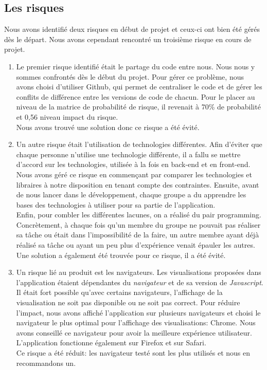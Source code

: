 \documentclass[t, 12pt, usenames,dvipsnames]{article}
\begin{document}
    \subsection{Les risques}
        \noindent Nous avons identifié deux risques en début de projet et ceux-ci ont bien été gérés dès le départ. Nous avons cependant rencontré un troisième risque en cours de projet. 
    
    \begin{enumerate}
        \item  Le premier risque identifié était le partage du code entre nous. Nous nous y sommes confrontés dès le début du projet. Pour gérer ce problème, nous avons choisi d'utiliser Github, qui permet de  centraliser le code et de gérer les conflits de différence entre les versions de code de chacun. Pour le placer au niveau de la matrice de probabilité de risque, il revenait à 70\% de probabilité et 0,56 niveau impact du risque. \\ Nous avons trouvé une solution donc ce risque a été évité.
        \item Un autre risque était l'utilisation de technologies différentes. Afin d'éviter que chaque personne n'utilise une technologie différente, il a fallu se mettre d'accord sur les technologies, utilisée à la fois en back-end et en front-end. Nous avons géré ce risque en commençant par comparer les technologies et libraires à notre disposition en tenant compte des contraintes.
        Ensuite, avant de nous lancer dans le développement, chaque groupe a du apprendre les bases des technologies à utiliser pour sa partie de l'application.\\
        Enfin, pour combler les différentes lacunes, on a réalisé du pair programming.
        Concrètement, à chaque fois qu'un membre du groupe ne pouvait pas réaliser sa tâche ou était dans l'impossibilité de la faire, un autre membre ayant déjà réalisé sa tâche ou ayant un peu plus d'expérience venait épauler les autres.\\ Une solution a également été trouvée pour ce risque, il a été évité.
        \item Un risque lié au produit est les navigateurs. Les visualisations proposées dans l'application étaient dépendantes du \textit{navigateur} et de sa version de \textit{Javascript}. Il était fort possible qu'avec certains navigateurs, l'affichage de la visualisation ne soit pas disponible ou ne soit pas correct. Pour réduire l'impact, nous avons affiché l'application sur plusieurs navigateurs et choisi le navigateur le plus optimal pour l'affichage des visualisations: Chrome. Nous avons conseillé ce navigateur pour avoir la meilleure expérience utilisateur. L'application fonctionne également sur Firefox et sur Safari.\\ Ce risque a été réduit: les navigateur testé sont les plus utilisés et nous en recommandons un.
    \end{enumerate}
    
\end{document}

